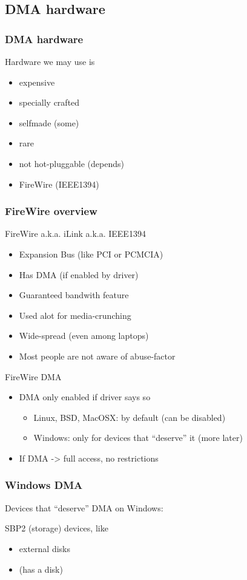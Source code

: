 \documentclass{beamer}
\newenvironment{itemizeframe}[1]
  {\begin{frame}{#1}\startitemizeframe}
  {\stopitemizeframe\end{frame}}
\newcommand\startitemizeframe{\begin{itemize}}
\newcommand\stopitemizeframe{\end{itemize}}
\begin{document}
	\subsection{DMA hardware}

		\begin{frame} \frametitle{DMA hardware}
			Hardware we may use is
			\begin{itemize}
				\item expensive
				\item specially crafted
				\item selfmade (some)
				\item rare
				\item not hot-pluggable (depends)
				\item {} FireWire (IEEE1394)
			\end{itemize}
		\end{frame}

		\begin{frame} \frametitle{FireWire overview}
			 FireWire a.k.a. iLink a.k.a. IEEE1394
			\begin{itemize}
				\item Expansion Bus (like PCI or PCMCIA)
				\item Has DMA (if enabled by driver)
				\item Guaranteed bandwith feature
				\item Used alot for media-crunching
				\item Wide-spread (even among laptops)
				\item Most people are not aware of abuse-factor
			\end{itemize}
		\end{frame}

		\begin{itemizeframe}{FireWire DMA}
			\item DMA only enabled if driver says so
			\begin{itemize}
				\item Linux, BSD, MacOSX: by default (can be disabled)
				\item Windows: only for devices that ``deserve'' it (more later)
			\end{itemize}
			\item If DMA -> full access, no restrictions
		\end{itemizeframe}

		\begin{frame} \frametitle{Windows DMA}
			Devices that ``deserve'' DMA on Windows:

			SBP2 (storage) devices, like
			\begin{itemize}
				\item external disks
				\item {} (has a disk)
			\end{itemize}

		\end{frame}
		
\end{document}
